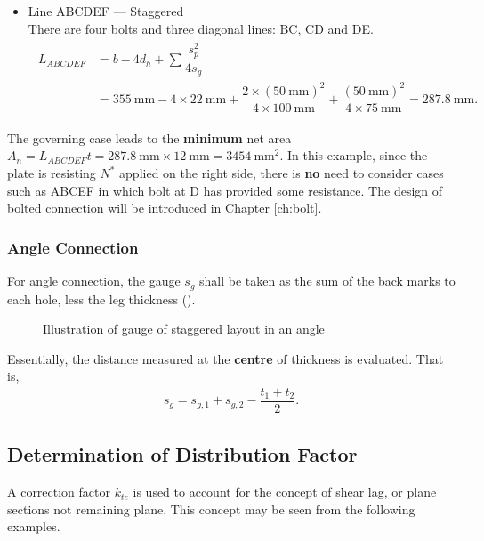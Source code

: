 \begin{solution}
\begin{itemize}
\item Line ABCDEF --- Staggered\\
There are four bolts and three diagonal lines: BC, CD and DE.
\begin{gather*}
\begin{split}
L_{ABCDEF}&=b-4d_h+\sum\dfrac{s_p^2}{4s_g}\\&=\SI{355}{\mm}-4\times\SI{22}{\mm}+\dfrac{2\times\left(\SI{50}{\mm}\right)^2}{4\times\SI{100}{\mm}}+\dfrac{\left(\SI{50}{\mm}\right)^2}{4\times\SI{75}{\mm}}=\SI{287.8}{\mm}.
\end{split}
\end{gather*}
\end{itemize}
The governing case leads to the \textbf{minimum} net area $A_n=L_{ABCDEF}t=\SI{287.8}{\mm}\times\SI{12}{\mm}=\SI{3454}{\mm^2}$. In this example, since the plate is resisting $N^*$ applied on the right side, there is \textbf{no} need to consider cases such as ABCEF in which bolt at D has provided some resistance. The design of bolted connection will be introduced in Chapter \ref{ch:bolt}.
\end{solution}
\subsubsection{Angle Connection}
For angle connection, the gauge $s_g$ shall be taken as the sum of the back marks to each hole, less the leg thickness ().
\begin{figure}[H]
\centering

\caption{Illustration of gauge of staggered layout in an angle}
\end{figure}
Essentially, the distance measured at the \textbf{centre} of thickness is evaluated. That is,
\begin{gather}
s_g=s_{g,1}+s_{g,2}-\dfrac{t_1+t_2}{2}.
\end{gather}
\subsection{Determination of Distribution Factor}
A correction factor $k_{te}$ is used to account for the concept of shear lag, or plane sections not remaining plane. This concept may be seen from the following examples.
\begin{figure}[H]
\centering

\end{figure}

